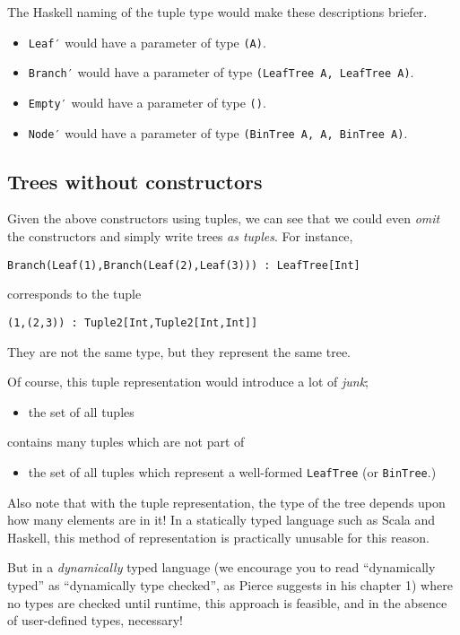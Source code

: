 \documentclass[11pt]{article}
\begin{document}
The Haskell naming of the tuple type would make
these descriptions briefer.
\begin{itemize}
\item \texttt{Leaf′} would have a parameter of type \texttt{(A)}.
\item \texttt{Branch′} would have a parameter of type \texttt{(LeafTree A, LeafTree A)}.
\item \texttt{Empty′} would have a parameter of type \texttt{()}.
\item \texttt{Node′} would have a parameter of  type \texttt{(BinTree A, A, BinTree A)}.
\end{itemize}

\subsection{Trees without constructors}
\label{sec:org220301d}
Given the above constructors using tuples,
we can see that we could even \emph{omit} the constructors
and simply write trees \emph{as tuples}. For instance,
\begin{verbatim}
Branch(Leaf(1),Branch(Leaf(2),Leaf(3))) : LeafTree[Int]
\end{verbatim}
corresponds to the tuple
\begin{verbatim}
(1,(2,3)) : Tuple2[Int,Tuple2[Int,Int]]
\end{verbatim}
They are not the same type, but they represent the same tree.

Of course, this tuple representation would introduce a lot of \emph{junk};
\begin{itemize}
\item the set of all tuples
\end{itemize}
contains many tuples which are not part of
\begin{itemize}
\item the set of all tuples
which represent a well-formed \texttt{LeafTree} (or \texttt{BinTree}.)
\end{itemize}

Also note that with the tuple representation,
the type of the tree depends upon how many elements are in it!
In a statically typed language such as Scala and Haskell,
this method of representation is practically unusable
for this reason.

But in a \emph{dynamically} typed language
(we encourage you to read “dynamically typed” as
“dynamically type checked”, as Pierce suggests in his chapter 1)
where no types are checked until runtime,
this approach is feasible,
and in the absence of user-defined types, necessary!
\end{document}
